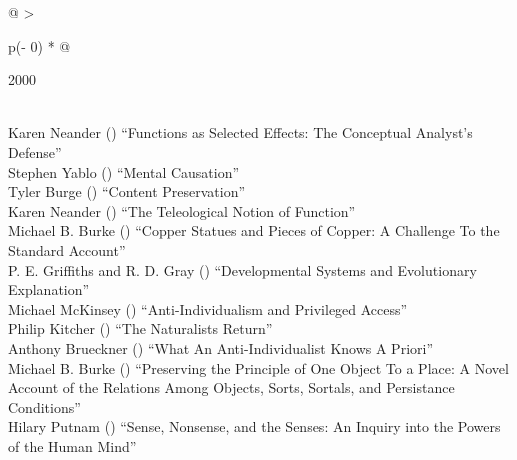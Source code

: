 \documentclass[
  10pt,
  letterpaper,
  DIV=11,
  numbers=noendperiod,
  twoside]{scrartcl}
\begin{document}
\begin{longtable}[]{@{}
  >{\raggedright\arraybackslash}p{(\columnwidth - 0\tabcolsep) * }@{}}

\caption{\label{tbl-top-ten-1991}Most cited articles published less than
ten years ago as of 2000.}

\tabularnewline

\toprule\noalign{}
\begin{minipage}[b]{\linewidth}\raggedright
2000
\end{minipage} \\
\midrule\noalign{}
\endhead
\bottomrule\noalign{}
\endlastfoot
Karen Neander
()
``Functions as Selected Effects: The Conceptual Analyst's Defense'' \\
Stephen Yablo
()
``Mental Causation'' \\
Tyler Burge
()
``Content Preservation'' \\
Karen Neander
()
``The Teleological Notion of Function'' \\
Michael B. Burke
()
``Copper Statues and Pieces of Copper: A Challenge To the Standard
Account'' \\
P. E. Griffiths and R. D. Gray
()
``Developmental Systems and Evolutionary Explanation'' \\
Michael McKinsey
()
``Anti-Individualism and Privileged Access'' \\
Philip Kitcher
()
``The Naturalists Return'' \\
Anthony Brueckner
()
``What An Anti-Individualist Knows A Priori'' \\
Michael B. Burke
()
``Preserving the Principle of One Object To a Place: A Novel Account of
the Relations Among Objects, Sorts, Sortals, and Persistance
Conditions'' \\
Hilary Putnam
()
``Sense, Nonsense, and the Senses: An Inquiry into the Powers of the
Human Mind'' \\

\end{longtable}
\end{document}
